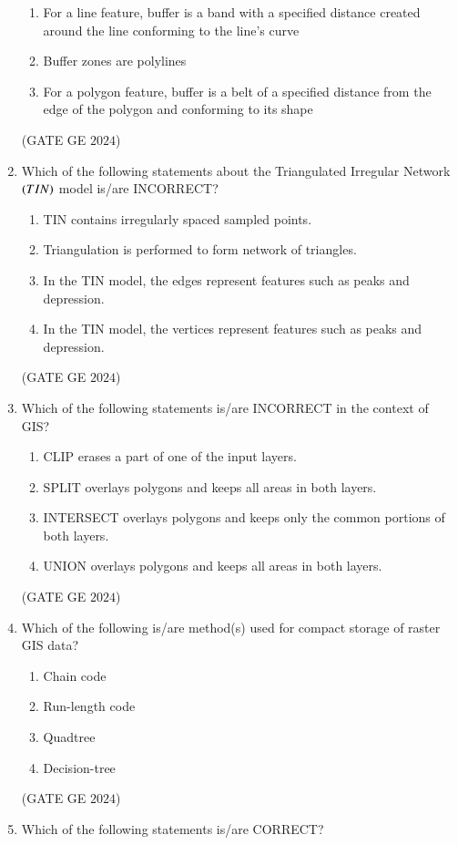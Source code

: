 \documentclass[journal,12pt,onecolumn]{IEEEtran}
\theoremstyle{remark}
\begin{document}
\begin{enumerate}
\begin{enumerate}
\item For a line feature, buffer is a band with a specified distance created around the line conforming to the line's curve
\item Buffer zones are polylines
\item For a polygon feature, buffer is a belt of a specified distance from the edge of the polygon and conforming to its shape
\end{enumerate}
\hfill{(GATE GE $2024$)}
\bigskip
\item Which of the following statements about the Triangulated Irregular Network $\left(TIN\right)$ model is/are INCORRECT?
\begin{enumerate}
\item TIN contains irregularly spaced sampled points.
\item Triangulation is performed to form network of triangles.
\item In the TIN model, the edges represent features such as peaks and depression.
\item In the TIN model, the vertices represent features such as peaks and depression.
\end{enumerate}
\hfill{(GATE GE $2024$)}
\bigskip
\item Which of the following statements is/are INCORRECT in the context of GIS?
\begin{enumerate}
\item CLIP erases a part of one of the input layers.
\item SPLIT overlays polygons and keeps all areas in both layers.
\item INTERSECT overlays polygons and keeps only the common portions of both layers.
\item UNION overlays polygons and keeps all areas in both layers.
\end{enumerate}
\hfill{(GATE GE $2024$)}
\bigskip
\item Which of the following is/are method(s) used for compact storage of raster GIS data?
\begin{enumerate}
\item Chain code
\item Run-length code
\item Quadtree
\item Decision-tree
\end{enumerate}
\hfill{(GATE GE $2024$)}
\bigskip
\item Which of the following statements is/are CORRECT?
\begin{enumerate}

\end{enumerate}
\end{enumerate}
\end{document}
